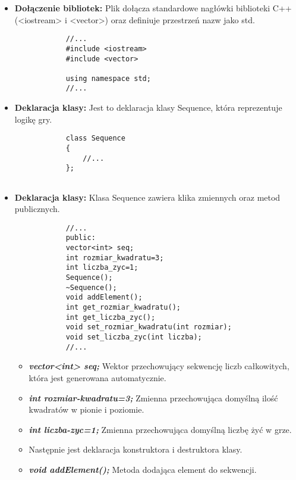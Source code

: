 \documentclass[]{report}
\begin{document}
	\begin{itemize}
		\item \textbf{Dołączenie bibliotek:} Plik dołącza standardowe nagłówki biblioteki C++ (<iostream> i <vector>) oraz definiuje przestrzeń nazw jako std.
		
		\begin{lstlisting}
			//...
			#include <iostream>
			#include <vector>
			
			using namespace std;
			//...
		\end{lstlisting}
		
		\item \textbf{Deklaracja klasy:} Jest to deklaracja klasy Sequence, która reprezentuje logikę gry.
		
		\begin{lstlisting}
			class Sequence
			{
				//...
			};
			
		\end{lstlisting}
		
		\item \textbf{Deklaracja klasy:} Klasa Sequence zawiera klika zmiennych oraz metod publicznych.
		
		\begin{lstlisting}
			//...
			public:
			vector<int> seq;
			int rozmiar_kwadratu=3;
			int liczba_zyc=1;
			Sequence();
			~Sequence();
			void addElement();
			int get_rozmiar_kwadratu();
			int get_liczba_zyc();
			void set_rozmiar_kwadratu(int rozmiar);
			void set_liczba_zyc(int liczba);
			//...
		\end{lstlisting}
		
		\begin{itemize}
			\item \textbf{\textit{vector<int> seq;}} Wektor przechowujący sekwencję liczb całkowitych, która jest generowana automatycznie.
			
			\item \textbf{\textit{int rozmiar-kwadratu=3;}} Zmienna przechowująca domyślną ilość kwadratów w pionie i poziomie.
			
			\item \textbf{\textit{int liczba-zyc=1;}} Zmienna przechowująca domyślną liczbę żyć w grze.
			
			\item Następnie jest deklaracja konstruktora i destruktora klasy.
			
			\item \textbf{\textit{void addElement();}} Metoda dodająca element do sekwencji.
			

\end{itemize}
\end{itemize}
\end{document}
